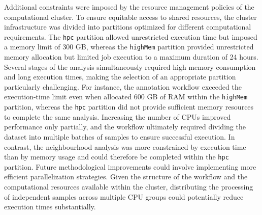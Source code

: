 Additional constraints were imposed by the resource management policies of the computational cluster. To ensure equitable access to shared resources, the cluster infrastructure was divided into partitions optimized for different computational requirements. The \texttt{hpc} partition allowed unrestricted execution time but imposed a memory limit of 300 GB, whereas the \texttt{highMem} partition provided unrestricted memory allocation but limited job execution to a maximum duration of 24 hours. Several stages of the analysis simultaneously required high memory consumption and long execution times, making the selection of an appropriate partition particularly challenging. For instance, the annotation workflow exceeded the execution-time limit even when allocated 600 GB of RAM within the \texttt{highMem} partition, whereas the \texttt{hpc} partition did not provide sufficient memory resources to complete the same analysis. Increasing the number of CPUs improved performance only partially, and the workflow ultimately required dividing the dataset into multiple batches of samples to ensure successful execution. In contrast, the neighbourhood analysis was more constrained by execution time than by memory usage and could therefore be completed within the \texttt{hpc} partition. Future methodological improvements could involve implementing more efficient parallelization strategies. Given the structure of the workflow and the computational resources available within the cluster, distributing the processing of independent samples across multiple CPU groups could potentially reduce execution times substantially.


